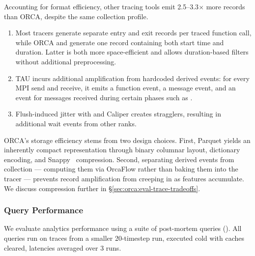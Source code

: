 Accounting for format efficiency, other tracing tools emit 2.5--3.3$\times$ more records than ORCA,
despite the same collection profile.
\begin{enumerate}[leftmargin=*]
  \item Most tracers generate separate entry and exit records per traced function call, while ORCA and \dftracer{} generate one record containing both start time and duration.
        Latter is both more space-efficient and allows duration-based filters without additional
        preprocessing.
  \item TAU incurs additional amplification from hardcoded derived events: for every
        MPI send and receive, it emits a function event, a message event, and an event for
        messages received during certain phases such as \mpiw{}.
  \item Flush-induced jitter with \scorep{} and Caliper creates stragglers,
        resulting in additional wait events from other ranks.
\end{enumerate}

ORCA's storage efficiency stems from two design choices.
First, Parquet yields an inherently compact representation through binary columnar layout,
dictionary encoding, and Snappy~\cite{2026:GoogleSnappy} compression.
Second, separating derived events from collection --- computing them via OrcaFlow rather than
baking them into the tracer --- prevents record amplification from creeping in as features
accumulate.
We discuss compression further in \S\ref{sec:orca:eval-trace-tradeoffs}.

\subsubsection{Query Performance}\label{sec:orca:eval-trace-query}
\figEvalQueryOnly{}
We evaluate analytics performance using a suite of post-mortem queries
().
All queries run on traces from a smaller 20-timestep run, executed cold with caches cleared,
latencies averaged over 3 runs.

